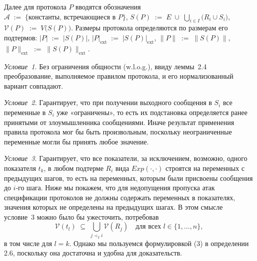 Далее для протокола \(P\) вводятся обозначения $\mathcal{A} \;:=\; \{\text{константы, встречающиеся в }P\}$,
$S(P) \;:=\; E \;\cup\;\bigcup_{i\in I}\bigl(R_i\cup S_i\bigr)$,
$\mathcal{V}(P) \;:=\; V\bigl(S(P)\bigr)$.
Размеры протокола определяются по размерам его подтермов:
$|P| \;:=\; \bigl|S(P)\bigr|$, $|P|_{\mathrm{ext}} \;:=\;\bigl|S(P)\bigr|_{\mathrm{ext}}$, $\|P\| \;:=\;\bigl\|S(P)\bigr\|$, $\|P\|_{\mathrm{ext}} \;:=\;\bigl\|S(P)\bigr\|_{\mathrm{ext}}$.

\medskip
\noindent\textit{Условие 1.} Без ограничения общности (w.l.o.g.), ввиду леммы 2.4 преобразование, выполняемое правилом протокола, и его нормализованный вариант совпадают.

\medskip
\noindent\textit{Условие 2.} Гарантирует, что при получении выходного сообщения в $S_i$ все переменные в $S_i$ уже «ограничены», то есть их подстановка определяется ранее принятыми от злоумышленника сообщениями. Иначе результат применения правила протокола мог бы быть произвольным, поскольку неограниченные переменные могли бы принять любое значение.

\medskip
\noindent\textit{Условие 3.} Гарантирует, что все показатели, за исключением, возможно, одного показателя $t_k$, в любом подтерме $R_i$ вида $Exp(\cdot,\cdot)$ строятся на переменных с предыдущих шагов, то есть на переменных, которым были присвоены сообщения до $i$‑го шага. Ниже мы покажем, что для недопущения пропуска атак спецификации протоколов не должны содержать переменных в показателях, значения которых не определены на предыдущих шагах. В этом смысле условие 3 можно было бы ужесточить, потребовав 
\[
\mathcal{V}(t_l)\;\subseteq\;\bigcup_{j\prec_I i}\mathcal{V}(R_j)
\quad\text{для всех }l\in\{1,\dots,n\},
\]
в том числе для $l=k$. Однако мы пользуемся формулировкой (3) в определении 2.6, поскольку она достаточна и удобна для доказательств.

